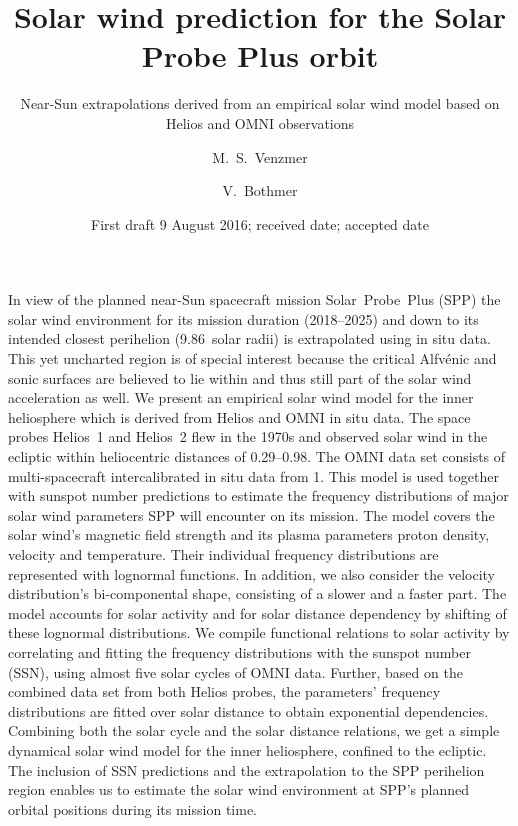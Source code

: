 
\title{Solar wind prediction for the Solar Probe Plus orbit}
\subtitle{Near-Sun extrapolations derived from an empirical solar wind model based on Helios and OMNI observations}

\author{M.~S.~Venzmer
\and V.~Bothmer}


\date{First draft 9 August 2016; received date; accepted date }

\abstract
{In view of the planned near-Sun spacecraft mission Solar~Probe~Plus (SPP) the solar wind environment for its mission duration (2018--2025) and down to its intended closest perihelion (\num{9.86}~solar radii) is extrapolated using in situ data. This yet uncharted region is of special interest because the critical Alfvénic and sonic surfaces are believed to lie within and thus still part of the solar wind acceleration as well.}	%
{We present an empirical solar wind model for the inner heliosphere which is derived from Helios and OMNI in situ data. The space probes Helios~1 and Helios~2 flew in the 1970s and observed solar wind in the ecliptic within heliocentric distances of \SIrange{0.29}{0.98}{\au}. The OMNI data set consists of multi-spacecraft intercalibrated in situ data from \SI{1}{\au}. This model is used together with sunspot number predictions to estimate the frequency distributions of major solar wind parameters SPP will encounter on its mission.}	%
{The model covers the solar wind's magnetic field strength and its plasma parameters proton density, velocity and temperature.
Their individual frequency distributions are represented with lognormal functions. In addition, we also consider the velocity distribution's bi-componental shape, consisting of a slower and a faster part. The model accounts for solar activity and for solar distance dependency by shifting of these lognormal distributions. We compile functional relations to solar activity by correlating and fitting the frequency distributions with the sunspot number (SSN), using almost five solar cycles of OMNI data. Further, based on the combined data set from both Helios probes, the parameters' frequency distributions are fitted over solar distance to obtain exponential dependencies. Combining both the solar cycle and the solar distance relations, we get a simple dynamical solar wind model for the inner heliosphere, confined to the ecliptic.}	%
{The inclusion of SSN predictions and the extrapolation to the SPP perihelion region enables us to estimate the solar wind environment at SPP's planned orbital positions during its mission time.}	%
{}	%

